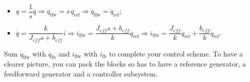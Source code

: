 \documentclass[11pt]{article}
\begin{document}
\begin{itemize}
    \item $q = \dfrac{1}{s}\dot{q} \Rightarrow \dot{q}_{\mathrm{ffw}} = s \, q_{\mathrm{ref}} \Rightarrow \dot{q}_{\mathrm{ffw}} = \dot{q}_{\mathrm{ref}}$;
    \item $\dot{q} = \dfrac{k}{J_{eff}s+b_{eff}} i \Rightarrow i_{\mathrm{ffw}} = \dfrac{J_{eff}s + b_{eff}}{k}  \dot{q}_{\mathrm{ref}} \Rightarrow i_{\mathrm{ffw}} = \dfrac{J_{eff}}{k} \ddot{q}_{\mathrm{ref}} +  \dfrac{b_{eff}}{k} \dot{q}_{\mathrm{ref}}$.
\end{itemize}
Sum $\dot{q}_{\mathrm{ffw}}$ with $\dot{q}_{\mathrm{fb}}$ and $i_{\mathrm{ffw}}$ with $i_{\mathrm{fb}}$ to complete your control scheme. To have a clearer picture, you can pack the blocks so has to have a reference generator, a feedforward generator and a controller subsystem.
\end{document}
